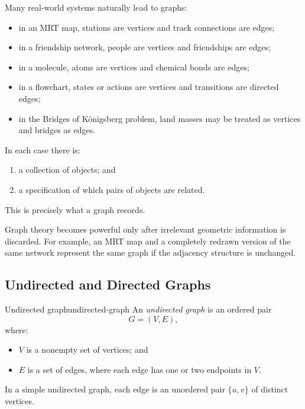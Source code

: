 Many real-world systems naturally lead to graphs:
\begin{itemize}[leftmargin=*]
    \item in an MRT map, stations are vertices and track connections are edges;
    \item in a friendship network, people are vertices and friendships are edges;
    \item in a molecule, atoms are vertices and chemical bonds are edges;
    \item in a flowchart, states or actions are vertices and transitions are directed edges;
    \item in the Bridges of Königsberg problem, land masses may be treated as vertices and bridges as edges.
\end{itemize}

\begin{examplebox}[title={Why these examples belong to one framework}]
In each case there is:
\begin{enumerate}[leftmargin=*]
    \item a collection of objects; and
    \item a specification of which pairs of objects are related.
\end{enumerate}
This is precisely what a graph records.
\end{examplebox}

\begin{extension}[title={Abstraction step in graph theory}]
Graph theory becomes powerful only after irrelevant geometric information is discarded. For example, an MRT map and a completely redrawn version of the same network represent the same graph if the adjacency structure is unchanged.
\end{extension}

\subsection{Undirected and Directed Graphs}

\begin{definition}{Undirected graph}{undirected-graph}
An \emph{undirected graph} is an ordered pair
\[
G=(V,E),
\]
where:
\begin{itemize}[leftmargin=*]
    \item \(V\) is a nonempty set of vertices; and
    \item \(E\) is a set of edges, where each edge has one or two endpoints in \(V\).
\end{itemize}
In a simple undirected graph, each edge is an unordered pair \(\{u,v\}\) of distinct vertices.
\end{definition}

